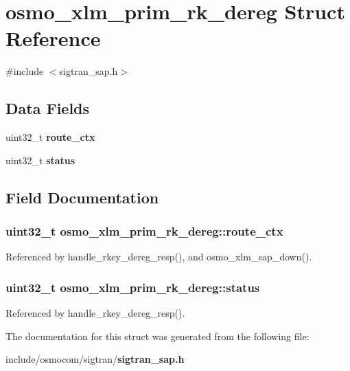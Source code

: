 \section{osmo\+\_\+xlm\+\_\+prim\+\_\+rk\+\_\+dereg Struct Reference}
\label{structosmo__xlm__prim__rk__dereg}


{\ttfamily \#include $<$sigtran\+\_\+sap.\+h$>$}

\subsection*{Data Fields}
\begin{DoxyCompactItemize}
\item 
uint32\+\_\+t {\bf route\+\_\+ctx}
\item 
uint32\+\_\+t {\bf status}
\end{DoxyCompactItemize}


\subsection{Field Documentation}
\subsubsection[{route\+\_\+ctx}]{\setlength{\rightskip}{0pt plus 5cm}uint32\+\_\+t osmo\+\_\+xlm\+\_\+prim\+\_\+rk\+\_\+dereg\+::route\+\_\+ctx}\label{structosmo__xlm__prim__rk__dereg_a0de5d9f2156df89be60f16ab54d1afd9}


Referenced by handle\+\_\+rkey\+\_\+dereg\+\_\+resp(), and osmo\+\_\+xlm\+\_\+sap\+\_\+down().

\subsubsection[{status}]{\setlength{\rightskip}{0pt plus 5cm}uint32\+\_\+t osmo\+\_\+xlm\+\_\+prim\+\_\+rk\+\_\+dereg\+::status}\label{structosmo__xlm__prim__rk__dereg_a718593e266ba21c85ed9464943003545}


Referenced by handle\+\_\+rkey\+\_\+dereg\+\_\+resp().



The documentation for this struct was generated from the following file\+:\begin{DoxyCompactItemize}
\item 
include/osmocom/sigtran/{\bf sigtran\+\_\+sap.\+h}\end{DoxyCompactItemize}
